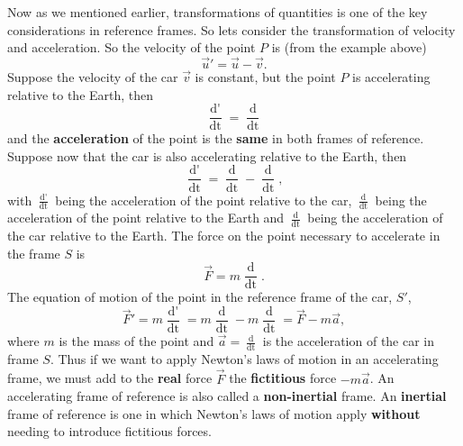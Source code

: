 Now as we mentioned earlier, transformations of quantities is one of the key considerations in reference frames. So lets consider the transformation of velocity and acceleration. So the velocity of the point $P$ is  (from the example above)
\begin{equation*}
    \vec{u}' = \vec{u} - \vec{v}.
\end{equation*}
Suppose the velocity of the car $\vec{v}$ is constant, but the point $P$ is accelerating relative to the Earth, then
\begin{equation*}
    \frac{\mathop{\mathrm{d}\vec{u}'}}{\mathop{\mathrm{d}t}} = \frac{\mathop{\mathrm{d}\vec{u}}}{\mathop{\mathrm{d}t}} 
\end{equation*}
and the \textbf{acceleration} of the point is the \textbf{same} in both frames of reference. Suppose now that the car is also accelerating relative to the Earth, then 
\begin{equation*}
    \frac{\mathop{\mathrm{d}\vec{u}'}}{\mathop{\mathrm{d}t}} = \frac{\mathop{\mathrm{d}\vec{u}}}{\mathop{\mathrm{d}t}} - \frac{\mathop{\mathrm{d}\vec{v}}}{\mathop{\mathrm{d}t}} ,
\end{equation*}
with $\frac{\mathop{\mathrm{d}\vec{u}'}}{\mathop{\mathrm{d}t}}$ being the acceleration of the point relative to the car, $\frac{\mathop{\mathrm{d}\vec{u}}}{\mathop{\mathrm{d}t}}$ being the acceleration of the point relative to the Earth and  $\frac{\mathop{\mathrm{d}\vec{v}}}{\mathop{\mathrm{d}t}}$ being the acceleration of the car relative to the Earth. The force on the point necessary to accelerate in the frame $S$ is
\begin{equation*}
    \vec{F} = m \frac{\mathop{\mathrm{d}\vec{u}}}{\mathop{\mathrm{d}t}}.
\end{equation*}
The equation of motion of the point in the reference frame of the car, $S'$,
\begin{equation*}
    \vec{F}' = m \frac{\mathop{\mathrm{d}\vec{u}'}}{\mathop{\mathrm{d}t}} = m \frac{\mathop{\mathrm{d}\vec{u}}}{\mathop{\mathrm{d}t}} - m \frac{\mathop{\mathrm{d}\vec{v}}}{\mathop{\mathrm{d}t}} = \vec{F} - m \vec{a},
\end{equation*}
where $m$ is the mass of the point and $\vec{a} = \frac{\mathop{\mathrm{d}\vec{v}}}{\mathop{\mathrm{d}t}}$ is the acceleration of the car in frame $S$. Thus if we want to apply Newton's laws of motion in an accelerating frame, we must add to the \textbf{real} force $\vec{F}$ the \textbf{fictitious} force $-m\vec{a}$. An accelerating frame of reference is also called a \textbf{non-inertial} frame. An \textbf{inertial} frame of reference is one in which Newton's laws of motion apply \textbf{without} needing to introduce fictitious forces.

